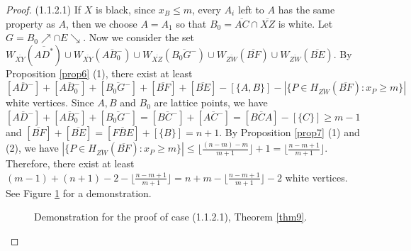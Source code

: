 \documentclass[preprint,12pt]{elsarticle}
\def\NEarrow#1{#1{\nearrow}}
\def\SEarrow#1{#1{\searrow}}
\begin{document}
{\begin{proof}
(1.1.2.1)
If $X$ is black,
since $x_B\leq m$, every $A_i$ left to $A$ has the same property as $A$,
then we choose $A=A_1$ so that $B_0=\overline{AC} \cap \overline{XZ}$ is white.
Let $G=\NEarrow{B_0} \cap \SEarrow{E}$.
Now we consider the set
$W_{\overline{XY}}(\overline{AD^*})\cup W_{\overline{XY}}(\overline{AB_0^-})
\cup W_{\overline{XZ}}(\overline{B_0G^-})
\cup W_{\overline{ZW}}(\overline{BF})\cup W_{\overline{ZW}}(\overline{BE})$.
By Proposition \ref{prop6} (1), there exist at least
$[\overline{AD^-}]+[\overline{AB_0^-}]+[\overline{B_0G^-}]+[\overline{BF}]+[\overline{BE}]
-[\{A,B\}]-|\{P\in H_{\overline{ZW}}(\overline{BF}): x_P\ge m\}|$
white vertices.
Since $A,B$ and $B_0$ are lattice points,
we have $[\overline{AD^-}]+[\overline{AB_0^-}]+[\overline{B_0G^-}]
=[\overline{BC^-}]+[\overline{AC^-}]=[\overline{BCA}]-[\{C\}]\ge m-1$
and $[\overline{BF}]+[\overline{BE}]=[\overline{FBE}]+[\{B\}]=n+1$.
By Proposition \ref{prop7} (1) and (2), we have
$|\{P\in H_{\overline{ZW}}(\overline{BF}):x_P\ge m\}|
\le\lfloor\frac{(n-m)-m}{m+1}\rfloor+1=\lfloor\frac{n-m+1}{m+1}\rfloor$.
Therefore, there exist at least $(m-1)+(n+1)-2-\lfloor\frac{n-m+1}{m+1}\rfloor
=n+m-\lfloor\frac{n-m+1}{m+1}\rfloor-2$ white vertices.
See Figure \ref{fig7} for a demonstration.


\begin{figure}[htb]
\centering
{}
\caption{Demonstration for the proof of case (1.1.2.1), Theorem \ref{thm9}.} \label{fig7}
\end{figure}


\end{proof}}
\end{document}
